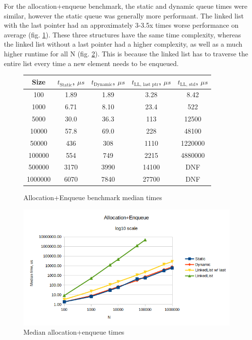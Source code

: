 \documentclass[a4paper,11pt]{article}
\begin{document}
    For the allocation+enqueue benchmark, the static and dynamic queue times were similar, however the static queue was generally more performant. The linked list with the last pointer had an approximately 3-3.5x times worse performance on average (fig. \ref{fig:ae-table}). These three structures have the same time complexity, whereas the linked list without a last pointer had a higher complexity, as well as a much higher runtime for all N (fig. \ref{fig:ae}). This is because the linked list has to traverse the entire list every time a new element needs to be enqueued.

    \begin{figure}[H]
        \centering
        
        \begin{tabular}{c|c|c|c|c}
            Size & $t_\text{Static}$, $\mu s$ & $t_\text{Dynamic}$, $\mu s$ & $t_\text{LL, last ptr}$, $\mu s$ & $t_\text{LL, std}$, $\mu s$ \\
            \hline
            \hline
            100 & 1.89 & 1.89 & 3.28 & 8.42 \\
            \hline
            1000 & 6.71 & 8.10 & 23.4 & 522 \\
            \hline
            5000 & 30.0 & 36.3 & 113 & 12500 \\
            \hline
            10000 & 57.8 & 69.0 & 228 & 48100 \\
            \hline
            50000 & 436 & 308 & 1110 & 1220000 \\
            \hline
            100000 & 554 & 749 & 2215 & 4880000 \\
            \hline
            500000 & 3170 & 3990 & 14100 & DNF \\
            \hline
            1000000 & 6070 & 7840 & 27700 & DNF \\
        \end{tabular}

        \caption{Allocation+Enqueue benchmark median times}
        \label{fig:ae-table}
    \end{figure}

    \begin{figure}[H]
        \centering
        \includegraphics[width=\textwidth]{ae.png}
        \caption{Median allocation+enqueue times}
        \label{fig:ae}
    \end{figure}
\end{document}

